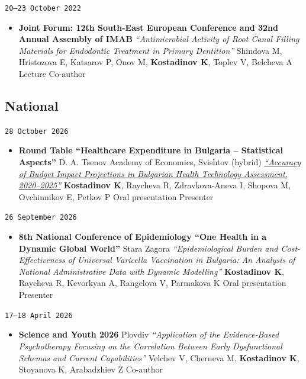 \documentclass[
  10.5pt,
  a4paper,
  DIV=11,
  numbers=noendperiod]{scrartcl}
\providecommand{\tightlist}{%
  \setlength{\itemsep}{0pt}\setlength{\parskip}{0pt}}
\let\oldtexttt\texttt
\renewcommand{\texttt}[1]{{\color{cvbronze}\small\oldtexttt{#1}}}
\begin{document}
\texttt{20–23\ October\ 2022}

\begin{itemize}
\tightlist
\item
  \textbf{Joint Forum: 12th South-East European Conference and 32nd
  Annual Assembly of IMAB} \textbar{} \emph{``Antimicrobial Activity of
  Root Canal Filling Materials for Endodontic Treatment in Primary
  Dentition''} \textbar{} Shindova M, Hristozova E, Katsarov P, Onov M,
  \textbf{Kostadinov K}, Toplev V, Belcheva A \textbar{} Lecture
  \textbar{} Co-author
\end{itemize}

\subsection{National}\label{national}

\texttt{28\ October\ 2026}

\begin{itemize}
\tightlist
\item
  \textbf{Round Table ``Healthcare Expenditure in Bulgaria --
  Statistical Aspects''} \textbar{} D. A. Tsenov Academy of Economics,
  Svishtov (hybrid) \textbar{}
  \emph{\href{https://www.uni-svishtov.bg/bg/events/kragla-masa-razhodite-za-zdraveopazvane-v-bulgaria-\%E2\%80\%93-statisticheski-aspekti}{``Accuracy
  of Budget Impact Projections in Bulgarian Health Technology
  Assessment, 2020--2025''}} \textbar{} \textbf{Kostadinov K}, Raycheva
  R, Zdravkova-Aneva I, Shopova M, Ovchinnikov E, Petkov P \textbar{}
  Oral presentation \textbar{} Presenter
\end{itemize}

\texttt{26\ September\ 2026}

\begin{itemize}
\tightlist
\item
  \textbf{8th National Conference of Epidemiology ``One Health in a
  Dynamic Global World''} \textbar{} Stara Zagora \textbar{}
  \emph{``Epidemiological Burden and Cost-Effectiveness of Universal
  Varicella Vaccination in Bulgaria: An Analysis of National
  Administrative Data with Dynamic Modelling''} \textbar{}
  \textbf{Kostadinov K}, Raycheva R, Kevorkyan A, Rangelova V, Parmakova
  K \textbar{} Oral presentation \textbar{} Presenter
\end{itemize}

\texttt{17–18\ April\ 2026}

\begin{itemize}
\tightlist
\item
  \textbf{Science and Youth 2026} \textbar{} Plovdiv \textbar{}
  \emph{``Application of the Evidence-Based Psychotherapy Focusing on
  the Correlation Between Early Dysfunctional Schemas and Current
  Capabilities''} \textbar{} Velchev V, Cherneva M, \textbf{Kostadinov
  K}, Stoyanova K, Arabadzhiev Z \textbar{} Co-author
\end{itemize}
\end{document}

